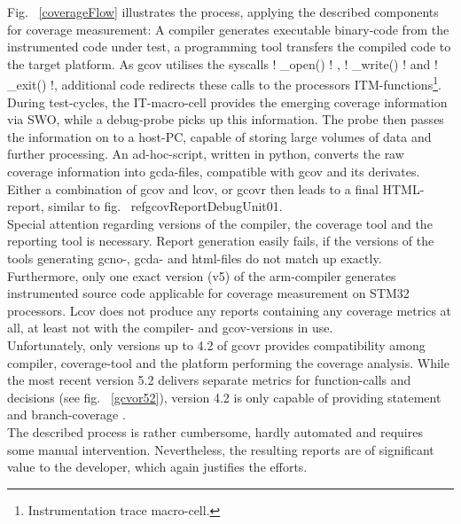 			Fig. ~\ref{coverageFlow} illustrates the process, applying the described components for coverage measurement: A compiler generates executable binary-code from the instrumented code under test, a programming tool transfers the compiled code to the target platform. As gcov utilises the syscalls \lstC ! _open() ! , \lstC ! _write() ! and  \lstC ! _exit() !, additional code redirects these calls to the processors ITM-functions\footnote{Instrumentation trace macro-cell.}. During test-cycles, the IT-macro-cell provides the emerging coverage information via SWO, while a debug-probe picks up this information. The probe then passes the information on to a host-PC, capable of storing large volumes of data and further processing. An ad-hoc-script, written in python, converts the raw coverage information into gcda-files, compatible with gcov and its derivates. Either a combination of gcov and lcov, or gcovr then leads to a final HTML-report, similar to fig. ~ref{gcovReportDebugUnit01}. \\
			Special attention regarding versions of the compiler, the coverage tool and the reporting tool is necessary. Report generation easily fails, if the versions of the tools generating gcno-, gcda- and html-files do not match up exactly. Furthermore, only one exact version (v5) of the arm-compiler generates instrumented source code applicable for coverage measurement on STM32 processors. Lcov does not produce any reports containing any coverage metrics at all, at least not with the compiler- and gcov-versions in use. \\
			Unfortunately, only versions up to 4.2 of gcovr provides compatibility among compiler, coverage-tool and the platform performing the coverage analysis. While the most recent version 5.2 delivers separate metrics for function-calls and decisions (see fig. ~\ref{gcvor52}), version 4.2 is only capable of providing statement and branch-coverage\cite{gcovr} . \\

			The described process is rather cumbersome, hardly automated and requires some manual intervention. Nevertheless, the resulting reports are of significant value to the developer, which again justifies the efforts. 

